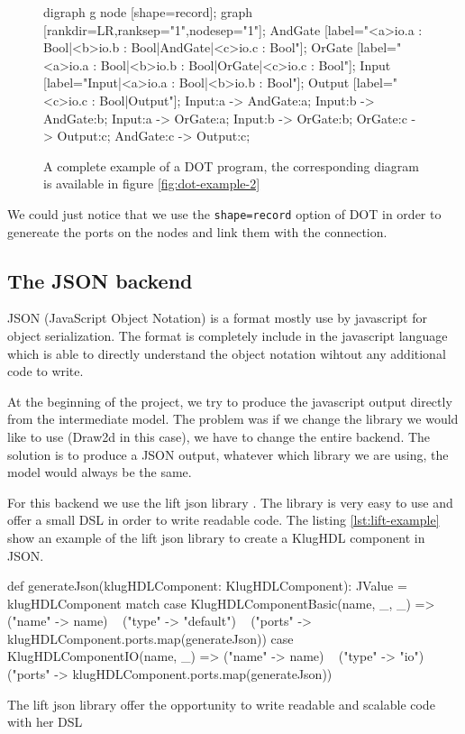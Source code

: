 \begin{figure}[H]
  \centering
  \begin{textcode}
    digraph g {
      node [shape=record];
      graph [rankdir=LR,ranksep="1",nodesep="1"];
      AndGate [label="{{<a>io.a : Bool|<b>io.b : Bool}|AndGate|{<c>io.c : Bool}}"];
      OrGate [label="{{<a>io.a : Bool|<b>io.b : Bool}|OrGate|{<c>io.c : Bool}}"];
      Input [label="{Input|{<a>io.a : Bool|<b>io.b : Bool}}"];
      Output [label="{{<c>io.c : Bool}|Output}"];
      Input:a -> AndGate:a;      Input:b -> AndGate:b;
      Input:a -> OrGate:a;       Input:b -> OrGate:b;
      OrGate:c -> Output:c;      AndGate:c -> Output:c;
    }
  \end{textcode}
  \caption[Example of a Graphviz program]{A complete example of a DOT program,
    the corresponding diagram is available in figure \ref{fig:dot-example-2}}
  \label{lst:dot-example-2}
\end{figure}

We could just notice that we use the \verb|shape=record| option of DOT in order
to genereate the ports on the nodes and link them with the connection.

\subsection{The JSON backend}
\label{sec:json-backend}

JSON (JavaScript Object Notation) is a format mostly use by javascript for
object serialization. The format is completely include in the javascript
language which is able to directly understand the object notation wihtout any
additional code to write.

At the beginning of the project, we try to produce the javascript
output directly from the intermediate model. The problem was if we change the
library we would like to use (Draw2d in this case), we have to change the entire
backend. The solution is to produce a JSON output, whatever which library we are
using, the model would always be the same.

For this backend we use the lift json library \cite{liftweb}. The library is
very easy to use and offer a small DSL in order to write readable code. The
listing \ref{lst:lift-example} show an example of the lift json library to create a
KlugHDL component in JSON.

\begin{listing}[H]
  \centering
  \begin{scalacode}
  def generateJson(klugHDLComponent: KlugHDLComponent): JValue = klugHDLComponent match {
    case KlugHDLComponentBasic(name, _, _) =>
      ("name" -> name) ~
      ("type" -> "default") ~
      ("ports" -> klugHDLComponent.ports.map(generateJson))
    case KlugHDLComponentIO(name, _) =>
      ("name" -> name) ~
      ("type" -> "io") ~
      ("ports" -> klugHDLComponent.ports.map(generateJson))
  }
  \end{scalacode}
  \caption[Lift library example : a json DSL]{The lift json library offer the
    opportunity to write readable and scalable code with her DSL}
  \label{lst:lift-example}
\end{listing}

